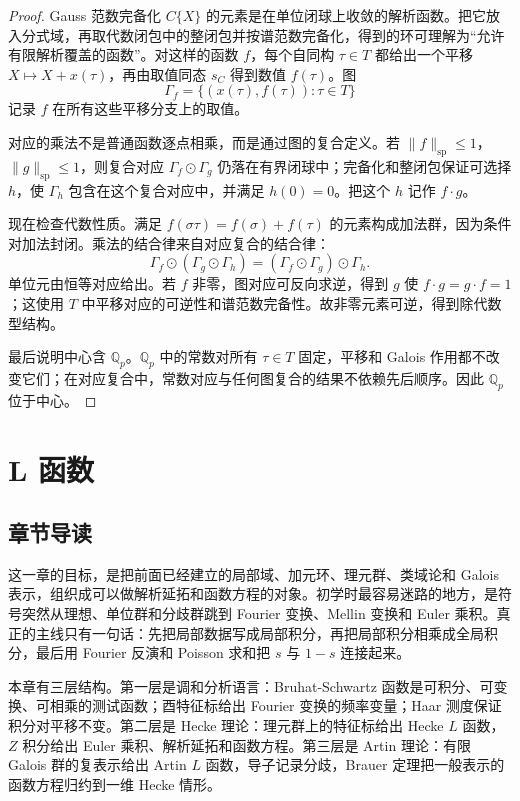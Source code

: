 \documentclass[11pt,a4paper,openany]{ctexbook}
\numberwithin{equation}{chapter}
\newcommand{\Q}{\mathbb{Q}}
\theoremstyle{plain}
\theoremstyle{definition}
\theoremstyle{remark}
\begin{document}
\begin{proof}
Gauss 范数完备化 $C\{X\}$ 的元素是在单位闭球上收敛的解析函数。把它放入分式域，再取代数闭包中的整闭包并按谱范数完备化，得到的环可理解为“允许有限解析覆盖的函数”。对这样的函数 $f$，每个自同构 $\tau\in T$ 都给出一个平移 $X\mapsto X+x(\tau)$，再由取值同态 $s_C$ 得到数值 $f(\tau)$。图
\[
  \Gamma_f=\{(x(\tau),f(\tau)):\tau\in T\}
\]
记录 $f$ 在所有这些平移分支上的取值。

对应的乘法不是普通函数逐点相乘，而是通过图的复合定义。若 $\|f\|_{\mathrm{sp}}\le1$，$\|g\|_{\mathrm{sp}}\le1$，则复合对应 $\Gamma_f\odot\Gamma_g$ 仍落在有界闭球中；完备化和整闭包保证可选择 $h$，使 $\Gamma_h$ 包含在这个复合对应中，并满足 $h(0)=0$。把这个 $h$ 记作 $f\cdot g$。

现在检查代数性质。满足 $f(\sigma\tau)=f(\sigma)+f(\tau)$ 的元素构成加法群，因为条件对加法封闭。乘法的结合律来自对应复合的结合律：
\[
  \Gamma_f\odot(\Gamma_g\odot\Gamma_h)
  =(\Gamma_f\odot\Gamma_g)\odot\Gamma_h.
\]
单位元由恒等对应给出。若 $f$ 非零，图对应可反向求逆，得到 $g$ 使 $f\cdot g=g\cdot f=1$；这使用 $T$ 中平移对应的可逆性和谱范数完备性。故非零元素可逆，得到除代数型结构。

最后说明中心含 $\Q_p$。$\Q_p$ 中的常数对所有 $\tau\in T$ 固定，平移和 Galois 作用都不改变它们；在对应复合中，常数对应与任何图复合的结果不依赖先后顺序。因此 $\Q_p$ 位于中心。
\end{proof}
 \chapter{L 函数}

\section{章节导读}

这一章的目标，是把前面已经建立的局部域、加元环、理元群、类域论和 Galois 表示，组织成可以做解析延拓和函数方程的对象。初学时最容易迷路的地方，是符号突然从理想、单位群和分歧群跳到 Fourier 变换、Mellin 变换和 Euler 乘积。真正的主线只有一句话：先把局部数据写成局部积分，再把局部积分相乘成全局积分，最后用 Fourier 反演和 Poisson 求和把 $s$ 与 $1-s$ 连接起来。

本章有三层结构。第一层是调和分析语言：Bruhat-Schwartz 函数是可积分、可变换、可相乘的测试函数；酉特征标给出 Fourier 变换的频率变量；Haar 测度保证积分对平移不变。第二层是 Hecke 理论：理元群上的特征标给出 Hecke $L$ 函数，$Z$ 积分给出 Euler 乘积、解析延拓和函数方程。第三层是 Artin 理论：有限 Galois 群的复表示给出 Artin $L$ 函数，导子记录分歧，Brauer 定理把一般表示的函数方程归约到一维 Hecke 情形。
\end{document}
